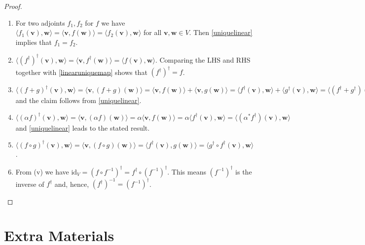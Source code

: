 \documentclass[a4paper,12pt]{report}
\begin{document}
\begin{appendices}
\begin{proof}
    \begin{enumerate}[label=(\(M\)\arabic*)]
        \item For two adjoints \(f_1, f_2\) for \(f\) we have \(\langle f_1(\mathbf{v}), \mathbf{w} \rangle = \langle \mathbf{v}, f(\mathbf{w}) \rangle = \langle f_2(\mathbf{v}), \mathbf{w} \rangle\) for all \(\mathbf{v}, \mathbf{w} \in V\). Then \cref{uniquelinear} implies that \(f_1 = f_2\).
        \item \(\langle (f^\dagger)^\dagger(\mathbf{v}), \mathbf{w} \rangle = \langle \mathbf{v}, f^\dagger(\mathbf{w}) \rangle = \langle f(\mathbf{v}), \mathbf{w} \rangle\). Comparing the LHS and RHS together with \cref{linearuniquemap} shows that \((f^\dagger)^\dagger = f\).
        \item \(\langle (f+g)^\dagger(\mathbf{v}), \mathbf{w} \rangle = \langle \mathbf{v}, (f+g)(\mathbf{w}) \rangle = \langle \mathbf{v}, f(\mathbf{w}) \rangle + \langle \mathbf{v}, g(\mathbf{w}) \rangle = \langle f^\dagger(\mathbf{v}), \mathbf{w} \rangle + \langle g^\dagger(\mathbf{v}), \mathbf{w} \rangle = \langle (f^\dagger + g^\dagger)(\mathbf{v}), \mathbf{w} \rangle\) and the claim follows from \cref{uniquelinear}.
        \item \(\langle (\alpha f)^\dagger(\mathbf{v}), \mathbf{w} \rangle = \langle \mathbf{v}, (\alpha f)(\mathbf{w}) \rangle = \alpha \langle \mathbf{v}, f(\mathbf{w}) \rangle = \alpha \langle f^\dagger(\mathbf{v}), \mathbf{w} \rangle = \langle (\alpha^* f^\dagger)(\mathbf{v}), \mathbf{w} \rangle\) and \cref{uniquelinear} leads to the stated result.
        \item \(\langle (f \circ g)^\dagger(\mathbf{v}), \mathbf{w} \rangle = \langle \mathbf{v}, (f \circ g)(\mathbf{w}) \rangle = \langle f^\dagger(\mathbf{v}), g(\mathbf{w}) \rangle = \langle g^\dagger \circ f^\dagger(\mathbf{v}), \mathbf{w} \rangle\).
        \item From (v) we have \(\text{id}_V = (f \circ f^{-1})^\dagger = f^\dagger \circ (f^{-1})^\dagger\). This means \((f^{-1})^\dagger\) is the inverse of \(f^\dagger\) and, hence, \((f^\dagger)^{-1} = (f^{-1})^\dagger\).
    \end{enumerate}
\end{proof}




\chapter{Extra Materials}


\end{appendices}
\end{document}
